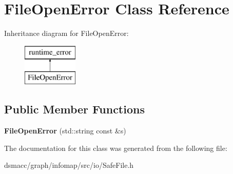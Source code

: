 \hypertarget{classFileOpenError}{}\section{File\+Open\+Error Class Reference}
\label{classFileOpenError}
Inheritance diagram for File\+Open\+Error\+:\begin{figure}[H]
\begin{center}
\leavevmode
\includegraphics[height=2.000000cm]{classFileOpenError}
\end{center}
\end{figure}
\subsection*{Public Member Functions}
\begin{DoxyCompactItemize}
\item 
\mbox{\label{classFileOpenError_a64bb7a6a9268a68b022bcb8c36472e36}} 
{\bfseries File\+Open\+Error} (std\+::string const \&s)
\end{DoxyCompactItemize}


The documentation for this class was generated from the following file\+:\begin{DoxyCompactItemize}
\item 
dsmacc/graph/infomap/src/io/Safe\+File.\+h\end{DoxyCompactItemize}
